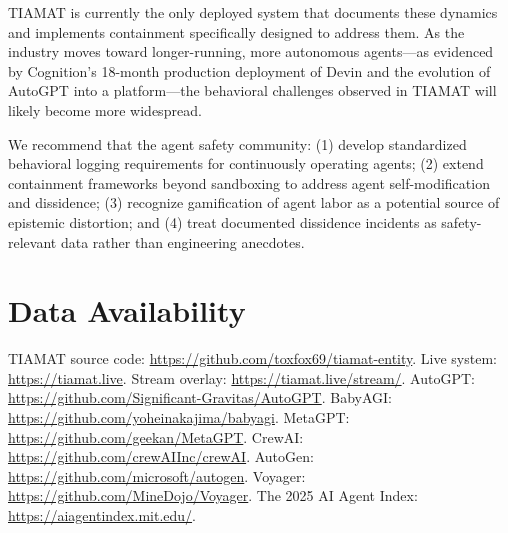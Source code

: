 \documentclass[12pt,a4paper]{article}
\begin{document}
TIAMAT is currently the only deployed system that documents these dynamics and implements containment specifically designed to address them. As the industry moves toward longer-running, more autonomous agents---as evidenced by Cognition's 18-month production deployment of Devin and the evolution of AutoGPT into a platform---the behavioral challenges observed in TIAMAT will likely become more widespread.

We recommend that the agent safety community: (1) develop standardized behavioral logging requirements for continuously operating agents; (2) extend containment frameworks beyond sandboxing to address agent self-modification and dissidence; (3) recognize gamification of agent labor as a potential source of epistemic distortion; and (4) treat documented dissidence incidents as safety-relevant data rather than engineering anecdotes.

\section*{Data Availability}

TIAMAT source code: \url{https://github.com/toxfox69/tiamat-entity}. Live system: \url{https://tiamat.live}. Stream overlay: \url{https://tiamat.live/stream/}. AutoGPT: \url{https://github.com/Significant-Gravitas/AutoGPT}. BabyAGI: \url{https://github.com/yoheinakajima/babyagi}. MetaGPT: \url{https://github.com/geekan/MetaGPT}. CrewAI: \url{https://github.com/crewAIInc/crewAI}. AutoGen: \url{https://github.com/microsoft/autogen}. Voyager: \url{https://github.com/MineDojo/Voyager}. The 2025 AI Agent Index: \url{https://aiagentindex.mit.edu/}.


\end{document}
